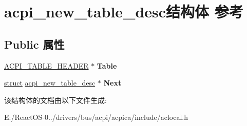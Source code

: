 \hypertarget{structacpi__new__table__desc}{}\section{acpi\+\_\+new\+\_\+table\+\_\+desc结构体 参考}
\label{structacpi__new__table__desc}
\subsection*{Public 属性}
\begin{DoxyCompactItemize}
\item 
\mbox{\label{structacpi__new__table__desc_a52028704b46e5cb10922489efa331f5e}} 
\hyperlink{structacpi__table__header}{A\+C\+P\+I\+\_\+\+T\+A\+B\+L\+E\+\_\+\+H\+E\+A\+D\+ER} $\ast$ {\bfseries Table}
\item 
\mbox{\label{structacpi__new__table__desc_aeadabdfa2945b15900d0e2f83cc07c38}} 
\hyperlink{interfacestruct}{struct} \hyperlink{structacpi__new__table__desc}{acpi\+\_\+new\+\_\+table\+\_\+desc} $\ast$ {\bfseries Next}
\end{DoxyCompactItemize}


该结构体的文档由以下文件生成\+:\begin{DoxyCompactItemize}
\item 
E\+:/\+React\+O\+S-\/0../drivers/bus/acpi/acpica/include/aclocal.\+h\end{DoxyCompactItemize}
